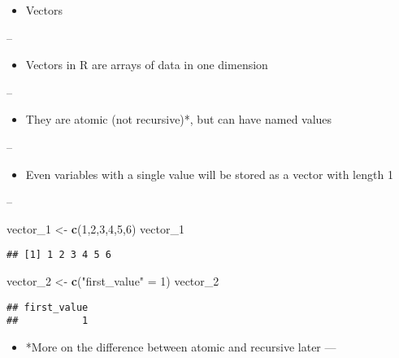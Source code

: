 \documentclass[]{article}
\newenvironment{Shaded}{\begin{snugshade}}{\end{snugshade}}
\newcommand{\DecValTok}[1]{\textcolor[rgb]{0.00,0.00,0.81}{#1}}
\newcommand{\KeywordTok}[1]{\textcolor[rgb]{0.13,0.29,0.53}{\textbf{#1}}}
\newcommand{\NormalTok}[1]{#1}
\newcommand{\StringTok}[1]{\textcolor[rgb]{0.31,0.60,0.02}{#1}}
\providecommand{\tightlist}{%
  \setlength{\itemsep}{0pt}\setlength{\parskip}{0pt}}
\begin{document}
\begin{itemize}
\tightlist
\item
  Vectors
\end{itemize}

--

\begin{itemize}
\tightlist
\item
  Vectors in R are arrays of data in one dimension
\end{itemize}

--

\begin{itemize}
\tightlist
\item
  They are atomic (not recursive)*, but can have named values
\end{itemize}

--

\begin{itemize}
\tightlist
\item
  Even variables with a single value will be stored as a vector with
  length 1
\end{itemize}

--

\begin{Shaded}
\begin{Highlighting}[]
\NormalTok{vector_}\DecValTok{1}\NormalTok{ <-}\StringTok{ }\KeywordTok{c}\NormalTok{(}\DecValTok{1}\NormalTok{,}\DecValTok{2}\NormalTok{,}\DecValTok{3}\NormalTok{,}\DecValTok{4}\NormalTok{,}\DecValTok{5}\NormalTok{,}\DecValTok{6}\NormalTok{)}
\NormalTok{vector_}\DecValTok{1}
\end{Highlighting}
\end{Shaded}

\begin{verbatim}
## [1] 1 2 3 4 5 6
\end{verbatim}

\begin{Shaded}
\begin{Highlighting}[]
\NormalTok{vector_}\DecValTok{2}\NormalTok{ <-}\StringTok{ }\KeywordTok{c}\NormalTok{(}\StringTok{"first_value"}\NormalTok{ =}\StringTok{ }\DecValTok{1}\NormalTok{)}
\NormalTok{vector_}\DecValTok{2}
\end{Highlighting}
\end{Shaded}

\begin{verbatim}
## first_value 
##           1
\end{verbatim}

\begin{itemize}
\tightlist
\item
  *More on the difference between atomic and recursive later ---
\end{itemize}
\end{document}
